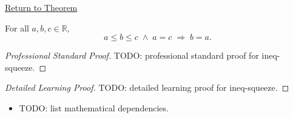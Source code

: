 \newpage
{}
\label{prf:ineq-squeeze}

\begin{remark*}[Return]
\hyperref[thm:ineq-squeeze]{Return to Theorem}
\end{remark*}

\begin{theorem*}[Squeeze]
For all $a, b, c \in \mathbb{R}$,
\[
  a \le b \le c \;\land\; a = c \;\Rightarrow\; b = a.
\]
\end{theorem*}

\begin{proof}[Professional Standard Proof]
\LRAProofBodyStart
TODO: professional standard proof for ineq-squeeze.
\end{proof}

\begin{proof}[Detailed Learning Proof]
\LRAProofBodyStart
TODO: detailed learning proof for ineq-squeeze.
\end{proof}

\begin{remark*}
\end{remark*}

\begin{dependencies}
\begin{itemize}
  \item TODO: list mathematical dependencies.
\end{itemize}
\end{dependencies}

\clearpage
